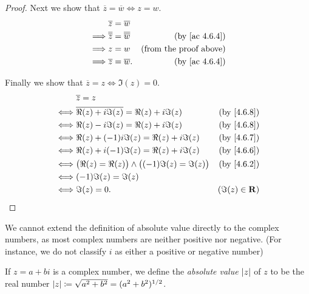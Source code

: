 \begin{proof}
  Next we show that \(\overline{z} = \overline{w} \iff z = w\).
  \begin{align*}
             & \overline{z} = \overline{w}                                                       \\
    \implies & \overline{\overline{z}} = \overline{\overline{w}} & \text{(by \cref{ac 4.6.4})}   \\
    \implies & z = w                                             & \text{(from the proof above)} \\
    \implies & \overline{z} = \overline{w}.                      & \text{(by \cref{ac 4.6.4})}
  \end{align*}

  Finally we show that \(\overline{z} = z \iff \Im(z) = 0\).
  \begin{align*}
         & \overline{z} = z                                                                          \\
    \iff & \overline{\Re(z) + i \Im(z)} = \Re(z) + i \Im(z)               & \text{(by \cref{4.6.8})} \\
    \iff & \Re(z) - i \Im(z) = \Re(z) + i \Im(z)                          & \text{(by \cref{4.6.8})} \\
    \iff & \Re(z) + (-1) i \Im(z) = \Re(z) + i \Im(z)                     & \text{(by \cref{4.6.7})} \\
    \iff & \Re(z) + i (-1) \Im(z) = \Re(z) + i \Im(z)                     & \text{(by \cref{4.6.6})} \\
    \iff & \big(\Re(z) = \Re(z)\big) \land \big((-1) \Im(z) = \Im(z)\big) & \text{(by \cref{4.6.2})} \\
    \iff & (-1) \Im(z) = \Im(z)                                                                      \\
    \iff & \Im(z) = 0.                                                    & (\Im(z) \in \R)
  \end{align*}
\end{proof}

\begin{note}
  We cannot extend the definition of absolute value directly to the complex numbers, as most complex numbers are neither positive nor negative.
  (For instance, we do not classify \(i\) as either a positive or negative number)
\end{note}

\begin{definition}\label{4.6.10}
  If \(z = a + bi\) is a complex number, we define the \emph{absolute value} \(\left\lvert z\right\rvert\) of \(z\) to be the real number \(\left\lvert z\right\rvert \coloneqq \sqrt{a^2 + b^2} = (a^2 + b^2)^{1 / 2}\).
\end{definition}

